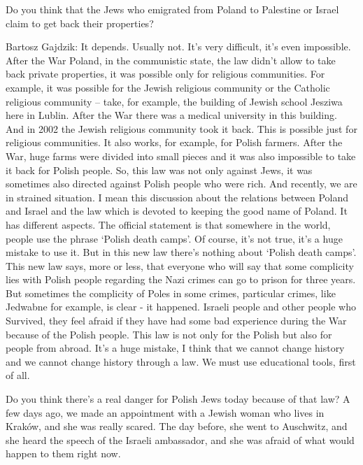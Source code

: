  Do you think that the Jews who emigrated from Poland to Palestine or Israel claim to get back their properties?  

Bartosz Gajdzik: It depends. Usually not. It’s very difficult, it’s even impossible. After the War Poland, in the communistic state, the law didn’t allow to take back private properties, it was possible only for religious communities. For example, it was possible for the Jewish religious community or the Catholic religious community – take, for example, the building of Jewish school Jesziwa here in Lublin. After the War there was a medical university in this building. And in 2002 the Jewish religious community took it back. This is possible just for religious communities. It also works, for example, for Polish farmers. After the War, huge farms were divided into small pieces and it was also impossible to take it back for Polish people. So, this law was not only against Jews, it was sometimes also directed against Polish people who were rich.  
And recently, we are in strained situation. I mean this discussion about the relations between Poland and Israel and the law which is devoted to keeping the good name of Poland. It has different aspects. The official statement is that somewhere in the world, people use the phrase ‘Polish death camps’. Of course, it’s not true, it’s a huge mistake to use it. But in this new law there’s nothing about ‘Polish death camps’. This new law says, more or less, that everyone who will say that some complicity lies with Polish people regarding the Nazi crimes can go to prison for three years. But sometimes the complicity of Poles in some crimes, particular crimes, like Jedwabne for example, is clear - it happened. Israeli people and other people who Survived, they feel afraid if they have had some bad experience during the War because of the Polish people. This law is not only for the Polish but also for people from abroad. It’s a huge mistake, I think that we cannot change history and we cannot change history through a law. We must use educational tools, first of all. 

Do you think there’s a real danger for Polish Jews today because of that law? A few days ago, we made an appointment with a Jewish woman who lives in Kraków, and she was really scared. The day before, she went to Auschwitz, and she heard the speech of the Israeli ambassador, and she was afraid of what would happen to them right now.  

